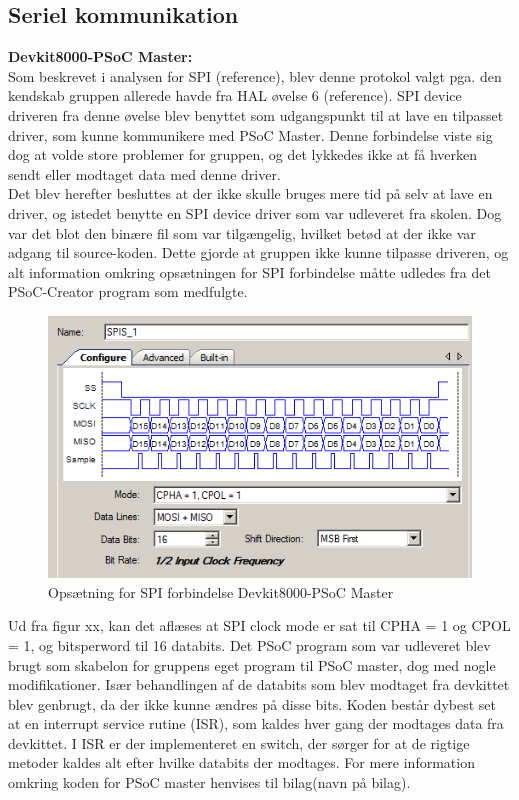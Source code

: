 \subsection{Seriel kommunikation}

\textbf{Devkit8000-PSoC Master:} \\

Som beskrevet i analysen for SPI (reference), blev denne protokol valgt pga. den kendskab gruppen allerede havde fra HAL øvelse 6 (reference). 
SPI device driveren fra denne øvelse blev benyttet som udgangspunkt til at lave en tilpasset driver, som kunne kommunikere med PSoC Master. 
Denne forbindelse viste sig dog at volde store problemer for gruppen, og det lykkedes ikke at få hverken sendt eller modtaget data med denne driver.\\

Det blev herefter besluttes at der ikke skulle bruges mere tid på selv at lave en driver, og istedet benytte en SPI device driver som var udleveret fra skolen.
Dog var det blot den binære fil som var tilgængelig, hvilket betød at der ikke var adgang til source-koden. Dette gjorde at gruppen ikke kunne tilpasse driveren,
og alt information omkring opsætningen for SPI forbindelse måtte udledes fra det PSoC-Creator program som medfulgte. 

\begin{figure}[H]
\includegraphics[scale=0.6]{tex/Design/SPI/Clock_mode_SPI}
\caption{Opsætning for SPI forbindelse Devkit8000-PSoC Master}
\end{figure}

Ud fra figur xx, kan det aflæses at SPI clock mode er sat til CPHA = 1 og CPOL = 1, og bitsperword til 16 databits. Det PSoC program som var udleveret blev brugt
som skabelon for gruppens eget program til PSoC master, dog med nogle modifikationer. Især behandlingen af de databits som blev modtaget fra devkittet blev 
genbrugt, da der ikke kunne ændres på disse bits. Koden består dybest set at en interrupt service rutine (ISR), som kaldes hver gang
der modtages data fra devkittet. I ISR er der implementeret en switch, der sørger for at de rigtige metoder kaldes alt efter hvilke databits der modtages.
For mere information omkring koden for PSoC master henvises til bilag(navn på bilag). \\

